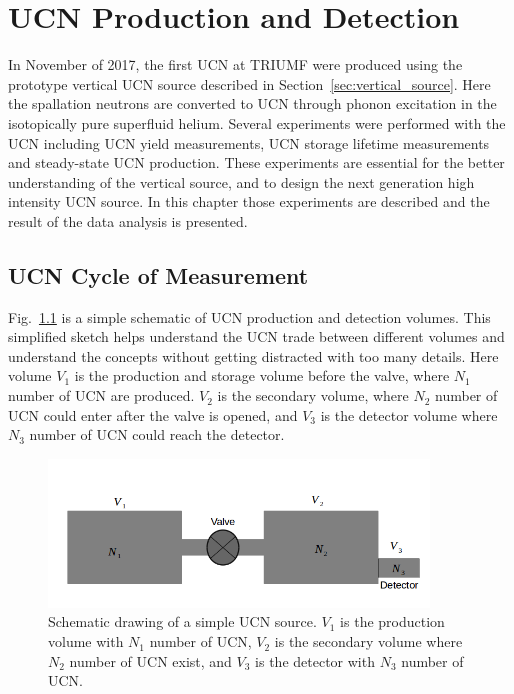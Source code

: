 \chapter{UCN Production and Detection\label{chap:UCNresult}}

In November of 2017, the first UCN at TRIUMF were produced using the
prototype vertical UCN source described in
Section~\ref{sec:vertical_source}. Here the spallation neutrons are
converted to UCN through phonon excitation in the isotopically pure
superfluid helium. Several experiments were performed with the UCN
including UCN yield measurements, UCN storage lifetime measurements
and steady-state UCN production. These experiments are essential for
the better understanding of the vertical source, and to design the next
generation high intensity UCN source. In this chapter those
experiments are described and the result of the data analysis is
presented.

\section{UCN Cycle of Measurement}
Fig.~\ref{fig:volume_schematic} is a simple schematic of UCN
production and detection volumes. This simplified sketch helps
understand the UCN trade between different volumes and understand the
concepts without getting distracted with too many details. Here volume
$V_1$ is the production and storage volume before the valve, where
$N_1$ number of UCN are produced. $V_2$ is the secondary volume, where
$N_2$ number of UCN could enter after the valve is opened, and $V_3$
is the detector volume where $N_3$ number of UCN could reach the
detector.



\begin{figure}[h]
  \centering
  \includegraphics[width=0.9\textwidth]{volume_schematic.png}
  \caption{Schematic drawing of a simple UCN source. $V_1$ is the
    production volume with $N_1$ number of UCN, $V_2$ is the secondary
    volume where $N_2$ number of UCN exist, and $V_3$ is the detector
    with $N_3$ number of UCN. }
  \label{fig:volume_schematic}
\end{figure}

